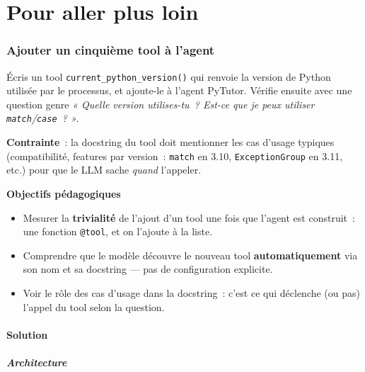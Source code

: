 \documentclass[11pt,a4paper]{article}
\begin{document}
\part{Pour aller plus loin}

\section{Ajouter un cinquième tool à l'agent}

\begin{tcolorbox}[title=Exercice bonus 1. Étendre l'inventaire de tools en une fonction]
Écris un tool \texttt{current\_python\_version()} qui renvoie la version
de Python utilisée par le processus, et ajoute-le à l'agent PyTutor.
Vérifie ensuite avec une question genre \emph{« Quelle version utilises-tu~?
Est-ce que je peux utiliser \texttt{match}/\texttt{case}~? »}.

\textbf{Contrainte}~: la docstring du tool doit mentionner les cas
d'usage typiques (compatibilité, features par version~: \texttt{match} en
3.10, \texttt{ExceptionGroup} en 3.11, etc.) pour que le LLM sache
\emph{quand} l'appeler.

\bigskip
\noindent\textbf{Objectifs pédagogiques}
\begin{itemize}[leftmargin=*]
  \item Mesurer la \textbf{trivialité} de l'ajout d'un tool une fois
        que l'agent est construit~: une fonction \texttt{@tool}, et
        on l'ajoute à la liste.
  \item Comprendre que le modèle découvre le nouveau tool
        \textbf{automatiquement} via son nom et sa docstring — pas de
        configuration explicite.
  \item Voir le rôle des cas d'usage dans la docstring~: c'est ce qui
        déclenche (ou pas) l'appel du tool selon la question.
\end{itemize}
\end{tcolorbox}

\subsection{Solution}

\subsubsection{Architecture}
\end{document}
